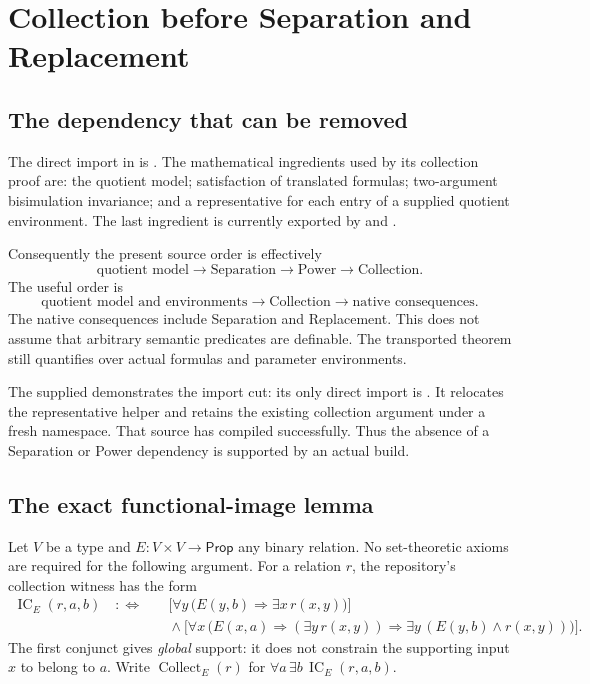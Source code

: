 \documentclass[11pt,letterpaper]{article}
\newcommand{\code}[1]{\texttt{\detokenize{#1}}}
\newcommand{\IC}{\operatorname{IC}}
\begin{document}
\section{Collection before Separation and Replacement}

\subsection{The dependency that can be removed}

The direct import in  is \code{KQ1Power}.
The mathematical ingredients used by its collection proof are:
the quotient model; satisfaction of translated formulas; two-argument
bisimulation invariance; and a representative for each entry of a supplied
quotient environment. The last ingredient is currently exported by
 and \code{mk_liftEnv}.

Consequently the present source order is effectively
\[
 \text{quotient model}\longrightarrow
 \text{Separation}\longrightarrow
 \text{Power}\longrightarrow
 \text{Collection}.
\]
The useful order is
\[
 \text{quotient model and environments}\longrightarrow
 \text{Collection}\longrightarrow
 \text{native consequences}.
\]
The native consequences include Separation and Replacement.
This does not assume that arbitrary semantic predicates are definable.
The transported theorem still quantifies over actual formulas and parameter
environments.\cite{collect,sep,repl}

The supplied  demonstrates the import cut:
its only direct import is \code{KQ1Model}. It relocates the representative
helper and retains the existing collection argument under a fresh namespace.
That source has compiled successfully. Thus the absence of a Separation or
Power dependency is supported by an actual build.

\subsection{The exact functional-image lemma}

Let \(V\) be a type and \(E:V\times V\to\mathsf{Prop}\) any binary relation.
No set-theoretic axioms are required for the following argument. For a
relation \(r\), the repository's collection witness has the form
\[
\begin{split}
\IC_E(r,a,b)\quad:\!\!\Longleftrightarrow\quad&
 \bigl[\forall y\,\bigl(E(y,b)\Rightarrow\exists x\,r(x,y)\bigr)\bigr]\\
&{}\land
 \bigl[\forall x\,\bigl(E(x,a)\Rightarrow
       (\exists y\,r(x,y))\Rightarrow
       \exists y\,(E(y,b)\land r(x,y))\bigr)\bigr].
\end{split}
\]
The first conjunct gives \emph{global} support: it does not constrain the
supporting input \(x\) to belong to \(a\).
Write \(\operatorname{Collect}_E(r)\) for
\(\forall a\,\exists b\,\IC_E(r,a,b)\).\cite{profile}
\end{document}
